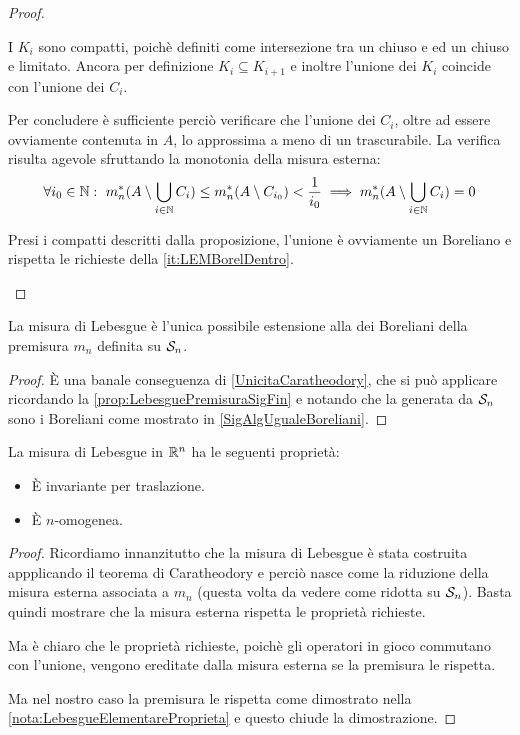 \begin{proof}
\begin{description}
		I $K_i$ sono compatti, poichè definiti come intersezione tra un chiuso e ed un chiuso e limitato. 
		Ancora per definizione $K_i\subseteq K_{i+1}$ e inoltre l'unione dei $K_i$ coincide con l'unione dei $C_i$.
		
		Per concludere è sufficiente perciò verificare che l'unione dei $C_i$, oltre ad essere ovviamente contenuta in $A$, lo approssima a meno di un trascurabile.
		La verifica risulta agevole sfruttando la monotonia della misura esterna:
		\begin{equation*}
			\forall i_0\in\N:\ m_n^*(A\setminus \bigcup_{i\in\N} C_i)\le m_n^*(A\setminus C_{i_0})< \frac 1{i_0}\implies m_n^*(A\setminus \bigcup_{i\in\N} C_i)=0
		\end{equation*}

		\item[\ImplicationProof{it:LEMCompattiDentro}{it:LEMBorelDentro}] Presi i compatti descritti dalla proposizione, l'unione è ovviamente un Boreliano e rispetta le richieste della \ref{it:LEMBorelDentro}.
	\end{description}

\end{proof}

\begin{proposition}\label{prop:LebesgueUnicaEstensione}
	La misura di Lebesgue è l'unica possibile estensione alla \sigalg{} dei Boreliani della premisura $m_n$ definita su $\S_n$.
\end{proposition}
\begin{proof}
	È una banale conseguenza di \cref{UnicitaCaratheodory}, che si può applicare ricordando la \cref{prop:LebesguePremisuraSigFin} e notando che la \sigalg{} generata da $\S_n$ sono i Boreliani come mostrato in \cref{SigAlgUgualeBoreliani}.
\end{proof}

\begin{remark}\label{nota:LebesgueProprieta}
	La misura di Lebesgue in $\R^n$ ha le seguenti proprietà:
	\begin{itemize}
		\item È invariante per traslazione.
		\item È $n$-omogenea.
	\end{itemize}
\end{remark}
\begin{proof}
	Ricordiamo innanzitutto che la misura di Lebesgue è stata costruita appplicando il teorema di Caratheodory e perciò nasce come la riduzione della misura esterna associata a $m_n$ (questa volta da vedere come ridotta su $\S_n$). 
	Basta quindi mostrare che la misura esterna rispetta le proprietà richieste.
	
	Ma è chiaro che le proprietà richieste, poichè gli operatori in gioco commutano con l'unione, vengono ereditate dalla misura esterna se la premisura le rispetta.
	
	Ma nel nostro caso la premisura le rispetta come dimostrato nella \cref{nota:LebesgueElementareProprieta} e questo chiude la dimostrazione.
\end{proof}

